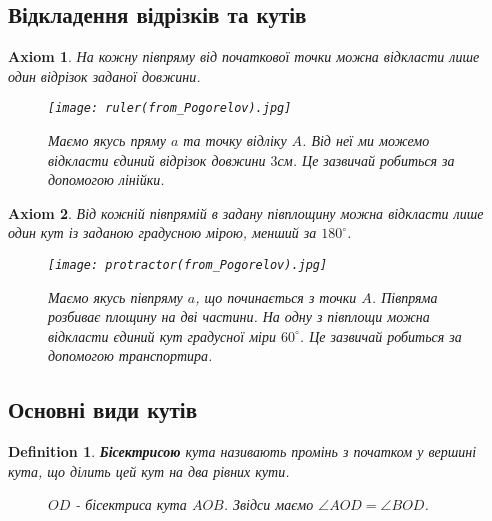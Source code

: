 \documentclass[a4paper, 10pt]{article}
\theoremstyle{theoremdd}
\theoremstyle{theoremdd}
\newtheorem{axiom}{Axiom}
\theoremstyle{theoremdd}
\newtheorem{definition}[theorem]{Definition}
\theoremstyle{theoremdd}
\theoremstyle{theoremdd}
\theoremstyle{theoremdd}
\theoremstyle{theoremdd}
\theoremstyle{theoremdd}
\theoremstyle{theoremdd}
\begin{document}
\subsection{Відкладення відрізків та кутів}
\begin{axiom}
На кожну півпряму від початкової точки можна відкласти лише один відрізок заданої довжини.
\begin{figure}[H]
\centering
\texttt{[image: ruler(from\_Pogorelov).jpg]}
\caption*{Маємо якусь пряму $a$ та точку відліку $A$. Від неї ми можемо відкласти єдиний відрізок довжини $3$см. Це зазвичай робиться за допомогою лінійки.}
\end{figure}
\end{axiom}

\begin{axiom}
Від кожній півпрямій в задану півплощину можна відкласти лише один кут із заданою градусною мірою, менший за $180^\circ$.
\begin{figure}[H]
\centering
\texttt{[image: protractor(from\_Pogorelov).jpg]}
\caption*{Маємо якусь півпряму $a$, що починається з точки $A$. Півпряма розбиває площину на дві частини. На одну з півплощи можна відкласти єдиний кут градусної міри $60^\circ$. Це зазвичай робиться за допомогою транспортира.}
\end{figure}
\end{axiom}

\subsection{Основні види кутів}
\begin{definition}
\textbf{Бісектрисою} кута називають промінь з початком у вершині кута, що ділить цей кут на два рівних кути.
\begin{figure}[H]
\centering
{}
\caption*{$OD$ - бісектриса кута $AOB$. Звідси маємо $\angle AOD = \angle BOD$.}
\end{figure}
\end{definition}
\end{document}
